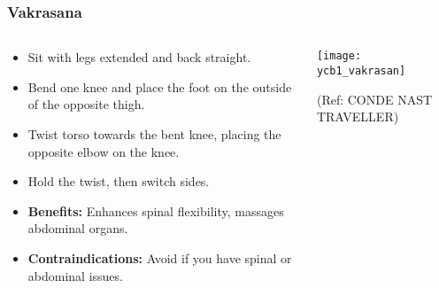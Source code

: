 \begin{frame}[fragile]\frametitle{Vakrasana}
\begin{columns}
    \begin{column}[T]{0.5\linewidth}
      \begin{itemize}
        \item Sit with legs extended and back straight.
        \item Bend one knee and place the foot on the outside of the opposite thigh.
        \item Twist torso towards the bent knee, placing the opposite elbow on the knee.
        \item Hold the twist, then switch sides.
        \item \textbf{Benefits:} Enhances spinal flexibility, massages abdominal organs.
        \item \textbf{Contraindications:} Avoid if you have spinal or abdominal issues.
      \end{itemize}
    \end{column}
    \begin{column}[T]{0.5\linewidth}
        \begin{center}
        \begin{center}
		        \texttt{[image: ycb1\_vakrasan]}
				
				{\tiny (Ref: CONDE NAST TRAVELLER)}	        
		\end{center}   
        \end{center}    
    \end{column}
  \end{columns}
\end{frame}

